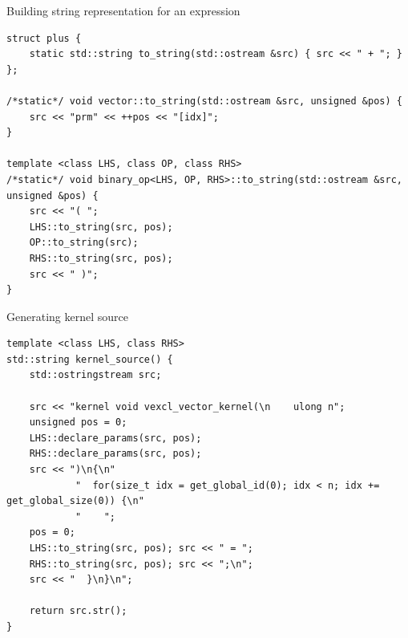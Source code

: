 \documentclass[@BEAMER_OPTIONS@]{beamer}
\begin{document}
\note{ }

\begin{frame}[fragile]{Building string representation for an expression}
    \begin{exampleblock}{}
        \begin{lstlisting}
struct plus {
    static std::string to_string(std::ostream &src) { src << " + "; }
};

/*static*/ void vector::to_string(std::ostream &src, unsigned &pos) {
    src << "prm" << ++pos << "[idx]";
}

template <class LHS, class OP, class RHS>
/*static*/ void binary_op<LHS, OP, RHS>::to_string(std::ostream &src, unsigned &pos) {
    src << "( ";
    LHS::to_string(src, pos);
    OP::to_string(src);
    RHS::to_string(src, pos);
    src << " )";
}
        \end{lstlisting}
    \end{exampleblock}
\end{frame}


\begin{frame}[fragile]{Generating kernel source}
    \begin{exampleblock}{}
        \begin{lstlisting}
template <class LHS, class RHS>
std::string kernel_source() {
    std::ostringstream src;

    src << "kernel void vexcl_vector_kernel(\n    ulong n";
    unsigned pos = 0;
    LHS::declare_params(src, pos);
    RHS::declare_params(src, pos);
    src << ")\n{\n"
            "  for(size_t idx = get_global_id(0); idx < n; idx += get_global_size(0)) {\n"
            "    ";
    pos = 0;
    LHS::to_string(src, pos); src << " = ";
    RHS::to_string(src, pos); src << ";\n";
    src << "  }\n}\n";

    return src.str();
}
        \end{lstlisting}
    \end{exampleblock}
\end{frame}

\note{ }
\end{document}
